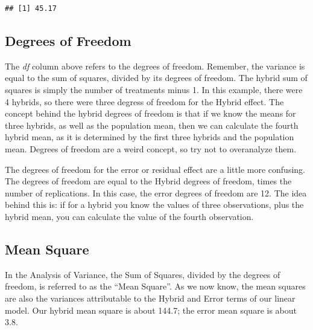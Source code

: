 \documentclass[
]{book}
\newenvironment{Shaded}{\begin{snugshade}}{\end{snugshade}}
\newcommand{\AttributeTok}[1]{\textcolor[rgb]{0.77,0.63,0.00}{#1}}
\newcommand{\FunctionTok}[1]{\textcolor[rgb]{0.00,0.00,0.00}{#1}}
\newcommand{\NormalTok}[1]{#1}
\newcommand{\SpecialCharTok}[1]{\textcolor[rgb]{0.00,0.00,0.00}{#1}}
\newcommand{\StringTok}[1]{\textcolor[rgb]{0.31,0.60,0.02}{#1}}
\begin{document}
\begin{Shaded}
\end{Shaded}

\begin{verbatim}
## [1] 45.17
\end{verbatim}

\hypertarget{degrees-of-freedom-1}{%
\subsection{Degrees of Freedom}\label{degrees-of-freedom-1}}

The \emph{df} column above refers to the degrees of freedom. Remember, the variance is equal to the sum of squares, divided by its degrees of freedom. The hybrid sum of squares is simply the number of treatments minus 1. In this example, there were 4 hybrids, so there were three degress of freedom for the Hybrid effect. The concept behind the hybrid degrees of freedom is that if we know the means for three hybrids, as well as the population mean, then we can calculate the fourth hybrid mean, as it is determined by the first three hybrids and the population mean. Degrees of freedom are a weird concept, so try not to overanalyze them.

The degrees of freedom for the error or residual effect are a little more confusing. The degrees of freedom are equal to the Hybrid degrees of freedom, times the number of replications. In this case, the error degrees of freedom are 12. The idea behind this is: if for a hybrid you know the values of three observations, plus the hybrid mean, you can calculate the value of the fourth observation.

\hypertarget{mean-square}{%
\subsection{Mean Square}\label{mean-square}}

In the Analysis of Variance, the Sum of Squares, divided by the degrees of freedom, is referred to as the ``Mean Square''. As we now know, the mean squares are also the variances attributable to the Hybrid and Error terms of our linear model. Our hybrid mean square is about 144.7; the error mean square is about 3.8.
\end{document}

